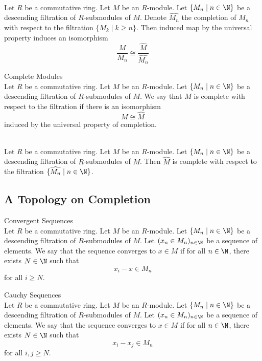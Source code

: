 \documentclass[a4paper]{article}
\begin{document}
\begin{prp}{}{}\\
Let $R$ be a commutative ring. Let $M$ be an $R$-module. Let $\{M_n\;|\;n\in\N\}$ be a descending filtration of $R$-submodules of $M$. Denote $\widehat{M_n}$ the completion of $M_n$ with respect to the filtration $\{M_k\;|\;k\geq n\}$. Then induced map by the universal property induces an isomorphism $$\frac{M}{M_n}\cong\frac{\widehat{M}}{\widehat{M_n}}$$
\end{prp}

\begin{defn}{Complete Modules}{}\\
Let $R$ be a commutative ring. Let $M$ be an $R$-module. Let $\{M_n\;|\;n\in\N\}$ be a descending filtration of $R$-submodules of $M$. We say that $M$ is complete with respect to the filtration if there is an isomorphism $$M\cong\widehat{M}$$ induced by the universal property of completion. 
\end{defn}

\begin{prp}{}{}\\
Let $R$ be a commutative ring. Let $M$ be an $R$-module. Let $\{M_n\;|\;n\in\N\}$ be a descending filtration of $R$-submodules of $M$. Then $\widehat{M}$ is complete with respect to the filtration $\{\widehat{M_n}\;|\;n\in\N\}$. 
\end{prp}

\subsection{A Topology on Completion}
\begin{defn}{Convergent Sequences}{}\\
Let $R$ be a commutative ring. Let $M$ be an $R$-module. Let $\{M_n\;|\;n\in\N\}$ be a descending filtration of $R$-submodules of $M$. Let $(x_n\in M_n)_{n\in\N}$ be a sequence of elements. We say that the sequence converges to $x\in M$ if for all $n\in\N$, there exists $N\in\N$ such that $$x_i-x\in M_n$$ for all $i\geq N$. 
\end{defn}

\begin{defn}{Cauchy Sequences}{}\\
Let $R$ be a commutative ring. Let $M$ be an $R$-module. Let $\{M_n\;|\;n\in\N\}$ be a descending filtration of $R$-submodules of $M$. Let $(x_n\in M_n)_{n\in\N}$ be a sequence of elements. We say that the sequence converges to $x\in M$ if for all $n\in\N$, there exists $N\in\N$ such that $$x_i-x_j\in M_n$$ for all $i,j\geq N$. 
\end{defn}
\end{document}
